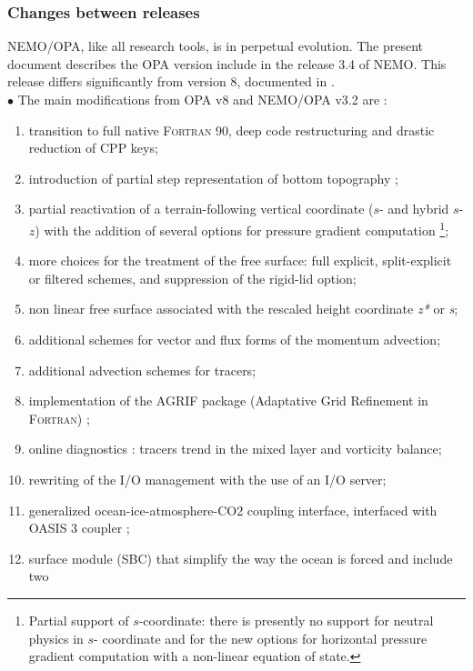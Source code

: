 \documentclass[NEMO_book]{subfiles}
\begin{document}
\subsubsection{Changes between releases}
NEMO/OPA, like all research tools, is in perpetual evolution. The present document describes 
the OPA version include in the release 3.4 of NEMO.  This release differs significantly
from version 8, documented in \citet{Madec1998}.\\

$\bullet$ The main modifications from OPA v8 and NEMO/OPA v3.2 are :\\
\begin{enumerate}
\item transition to full native \textsc{Fortran} 90, deep code restructuring and drastic 
reduction of CPP keys; 
\item introduction of partial step representation of bottom topography \citep{Barnier_al_OD06, Le_Sommer_al_OM09, Penduff_al_OS07}; 
\item partial reactivation of a terrain-following vertical coordinate ($s$- and hybrid $s$-$z$) 
with the addition of several options for pressure gradient computation \footnote{Partial 
support of $s$-coordinate: there is presently no support for neutral physics in $s$-
coordinate and for the new options for horizontal pressure gradient computation with 
a non-linear equation of state.}; 
\item more choices for the treatment of the free surface: full explicit, split-explicit or filtered 
schemes, and suppression of the rigid-lid option;
\item non linear free surface associated with the rescaled height coordinate  
\textit{z*} or  \textit{s}; 
\item additional schemes for vector and flux forms of the momentum  advection; 
\item additional advection schemes for tracers; 
\item implementation of the AGRIF package (Adaptative Grid Refinement in \textsc{Fortran}) \citep{Debreu_al_CG2008}; 
\item online diagnostics : tracers trend in the mixed layer and vorticity balance;
\item rewriting of the I/O management with the use of an I/O server; 
\item generalized ocean-ice-atmosphere-CO2 coupling interface, interfaced with OASIS 3 coupler ;
\item surface module (SBC) that simplify the way the ocean is forced and include two

\end{enumerate}
\end{document}
